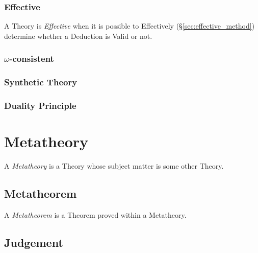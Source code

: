 \subsubsection{Effective}\label{sec:effective_theory}

A Theory is \emph{Effective} when it is possible to Effectively
(\S\ref{sec:effective_method}) determine whether a Deduction is Valid
or not.



\subsubsection{$\omega$-consistent}\label{sec:omega_consistent}

\subsubsection{Synthetic Theory}\label{sec:synthetic_theory}

\subsubsection{Duality Principle}\label{sec:duality_principle}



\section{Metatheory} \label{sec:metatheory}

A \emph{Metatheory} is a Theory whose subject matter is some other
Theory.



\subsection{Metatheorem}\label{sec:metatheorem}

A \emph{Metatheorem} is a Theorem proved within a Metatheory.



\subsection{Judgement}\label{sec:judgement}

